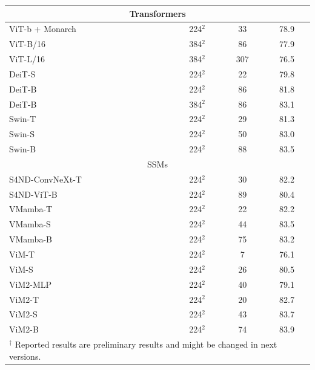\documentclass{article}
\begin{document}
\begin{table}[t]
{\begin{tabular}{lccc}
\toprule
\multicolumn{4}{c}{Transformers}\\
\toprule
ViT-b + Monarch~\citep{fu2023monarch} & 224$^2$ & 33 & 78.9 \\
\midrule
ViT-B/16~\citep{dosovitskiy2021ViT} & 384$^2$ & 86  & 77.9 \\
ViT-L/16~\citep{dosovitskiy2021ViT} & 384$^2$ & 307  & 76.5 \\
\midrule
DeiT-S~\citep{touvron2021training} & 224$^2$ & 22  & 79.8 \\
DeiT-B~\citep{touvron2021training} & 224$^2$ & 86   & 81.8 \\
DeiT-B~\citep{touvron2021training} & 384$^2$ & 86  & 83.1 \\
\midrule
Swin-T~\citep{liu2021swin} & 224$^2$ & 29  & 81.3 \\
Swin-S~\citep{liu2021swin} & 224$^2$ & 50   & 83.0 \\
Swin-B~\citep{liu2021swin} & 224$^2$ & 88   & 83.5 \\
\toprule
\multicolumn{4}{c}{SSMs}\\
\toprule
S4ND-ConvNeXt-T~\citep{nguyen2022s4nd} & 224$^2$ & 30  & 82.2 \\
S4ND-ViT-B~\citep{nguyen2022s4nd} & 224$^2$ & 89  & 80.4 \\
\midrule
VMamba-T~\citep{liu2024vmamba} & 224$^2$ & 22   & 82.2 \\
VMamba-S~\citep{liu2024vmamba} & 224$^2$ & 44  & 83.5 \\
VMamba-B~\citep{liu2024vmamba} & 224$^2$ & 75  & 83.2 \\
\midrule
ViM-T~\citep{zhu2024ViM} & 224$^2$ & 7  & 76.1 \\
ViM-S~\citep{zhu2024ViM} & 224$^2$ & 26  & 80.5 \\
\midrule
\rowcolor{myblue}
ViM2-MLP & 224$^2$ & 40  & 79.1 \\
\midrule
\rowcolor{myblue}
ViM2-T & 224$^2$ & 20   & 82.7 \\
\rowcolor{myblue}
ViM2-S & 224$^2$ & 43   & 83.7 \\
\rowcolor{myblue}
ViM2-B & 224$^2$ & 74  & 83.9 \\
\bottomrule
\multicolumn{4}{l}{$^\dagger$ Reported results are preliminary results and might be changed in next versions.}

\end{tabular}}
\end{table}
\end{document}
